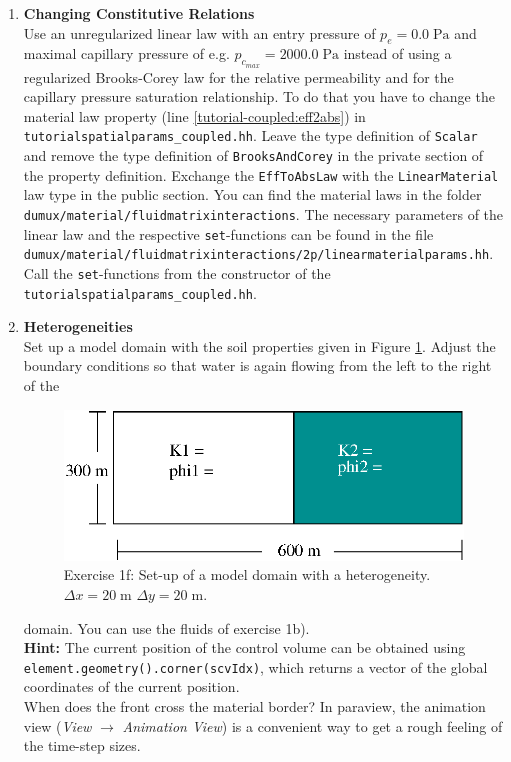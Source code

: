 \begin{enumerate}
\item \textbf{Changing Constitutive Relations} \\
  Use an unregularized linear law with an entry pressure of $p_e = 0.0\;\text{Pa}$ and maximal capillary pressure of e.g. $p_{c_{max}} = 2000.0\;\text{Pa}$ instead of using a
 regularized Brooks-Corey law for the
  relative permeability and for the capillary pressure saturation relationship. To do that you have
  to change the material law property (line \ref{tutorial-coupled:eff2abs}) in \texttt{tutorialspatialparams\_coupled.hh}. Leave the type definition of \texttt{Scalar} and remove
 the type definition of \texttt{BrooksAndCorey} in the private section of the property definition. Exchange the \texttt{EffToAbsLaw} with the \texttt{LinearMaterial} law type in the 
public section.
 You can find the material laws in the folder 
  \verb+dumux/material/fluidmatrixinteractions+. The necessary parameters
of the linear law and the respective \texttt{set}-functions can be found
 in the file \\
 \verb+dumux/material/fluidmatrixinteractions/2p/linearmaterialparams.hh+.\\
Call the \texttt{set}-functions from the constructor of the \texttt{tutorialspatialparams\_coupled.hh}.
 
\item \textbf{Heterogeneities}  \\
  Set up a model domain with the soil properties given in Figure
  \ref{tutorial-coupled:exercise1_d}. Adjust the boundary conditions
  so that water is again flowing from the left to the right of the
\begin{figure}[ht]
\centering
\includegraphics[width=0.5\linewidth,keepaspectratio]{EPS/exercise1_c.eps}
\caption{Exercise 1f: Set-up of a model domain with a heterogeneity. $\Delta x = 20 \;\text{m}$ $\Delta y = 20\;\text{m}$.}\label{tutorial-coupled:exercise1_d}
\end{figure}
domain. You can use the fluids of exercise 1b).\\
\textbf{Hint:} The current position of the control volume can be obtained using \texttt{element\allowbreak.geometry()\allowbreak.corner(scvIdx)}, which
returns a vector of the global coordinates of the current position.\\
When does the front cross the material border? In paraview, the
animation view (\textit{View} $\rightarrow$ \textit{Animation
  View}) is a convenient way to get a rough feeling of the time-step
sizes.
\end{enumerate}

